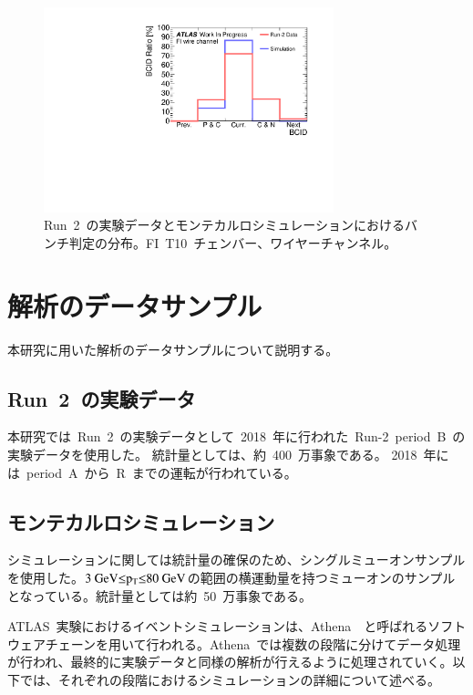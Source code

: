 \begin{figure}[H]
        \centering   
        \includegraphics[width=0.75\textwidth,page=1]{img/pdf5/BCID0.pdf}
        \caption[Run~2~の実験データとモンテカルロシミュレーションにおけるバンチ判定の分布]{Run~2~の実験データとモンテカルロシミュレーションにおけるバンチ判定の分布。FI~T10~チェンバー、ワイヤーチャンネル。}
        \label{fig:bcid00}
\end{figure}

\section{解析のデータサンプル}
本研究に用いた解析のデータサンプルについて説明する。

\subsection{Run~2~の実験データ}
本研究では~Run~2~の実験データとして~2018~年に行われた~Run-2~period~B~の実験データを使用した。
統計量としては、約~400~万事象である。
2018~年には~period~A~から~R~までの運転が行われている。

\subsection{モンテカルロシミュレーション}
シミュレーションに関しては統計量の確保のため、シングルミューオンサンプルを使用した。$3~\rm{GeV}{\leq}p_{\rm{T}}{\leq}80~GeV$の範囲の横運動量を持つミューオンのサンプルとなっている。統計量としては約~50~万事象である。

ATLAS~実験におけるイベントシミュレーションは、Athena~\cite{URL:21}~と呼ばれるソフトウェアチェーンを用いて行われる。Athena~では複数の段階に分けてデータ処理が行われ、最終的に実験データと同様の解析が行えるように処理されていく。以下では、それぞれの段階におけるシミュレーションの詳細について述べる。

